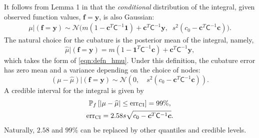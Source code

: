 \documentclass{svjour3}                     %
\newcommand{\bm}[1]{\boldsymbol{#1}}
\newcommand{\vc}{\bm{c}}
\newcommand{\vf}{\bm{f}}
\newcommand{\vy}{\bm{y}}
\newcommand{\vone}{\bm{1}}
\newcommand{\mC}{\mathsf{C}}
\newcommand{\calN}{\mathcal{N}}
\newcommand{\hmu}{\widehat{\mu}}
\newcommand{\CI}{\textup{CI}}
\newcommand{\err}{\textup{err}}
\begin{document}
It follows from Lemma 1 
in \cite{JagHic19a} that the \emph{conditional} distribution of the integral, given observed function values, $\vf = \vy$, is also Gaussian:
\begin{align} \label{eqn:condInteg}
\mu | (\vf = \vy) \sim \calN \bigl(m (1 - \vc^T \mC^{-1} \vone)  + \vc^T \mC^{-1} \vy, \;\;
s^2(c_0  -\vc ^T \mC^{-1} \vc) \bigr).
\end{align}
The natural choice for  the cubature is the posterior mean of the integral, namely, 
\begin{equation}
\label{eqn:BayesCub}
\widehat{\mu}  \vert ( \vf = \vy)
= m(1 - \vone^T  \mC^{-1}\vc )
+ \vc^T \mC^{-1} \vy,
\end{equation}
which takes the form of \eqref{eqn:defn_hmu}.
Under this definition, the cubature error has zero mean and a variance depending on the choice of nodes:
\begin{equation*}
(\mu-\hmu) | (\vf = \vy)
\sim  \calN 
\left(
0, \quad
s^2 (c_0 - \vc^T\mC^{-1}\vc) 
\right).
\end{equation*}
A credible interval for the integral is given by 
\begin{subequations} \label{eqn_prob_confidence_interval}
	\begin{gather}
	\mathbb{P}_f \left[
	|\mu-\hmu| \leq \err_{\CI}
	\right] = 99\%, \\
	\err_{\CI} = 2.58 s \sqrt{c_{0} - \vc^T\mC^{-1}\vc}.
	\end{gather}
\end{subequations}
Naturally, $2.58$ and $99\%$ can be replaced by other quantiles and credible levels.
\end{document}
